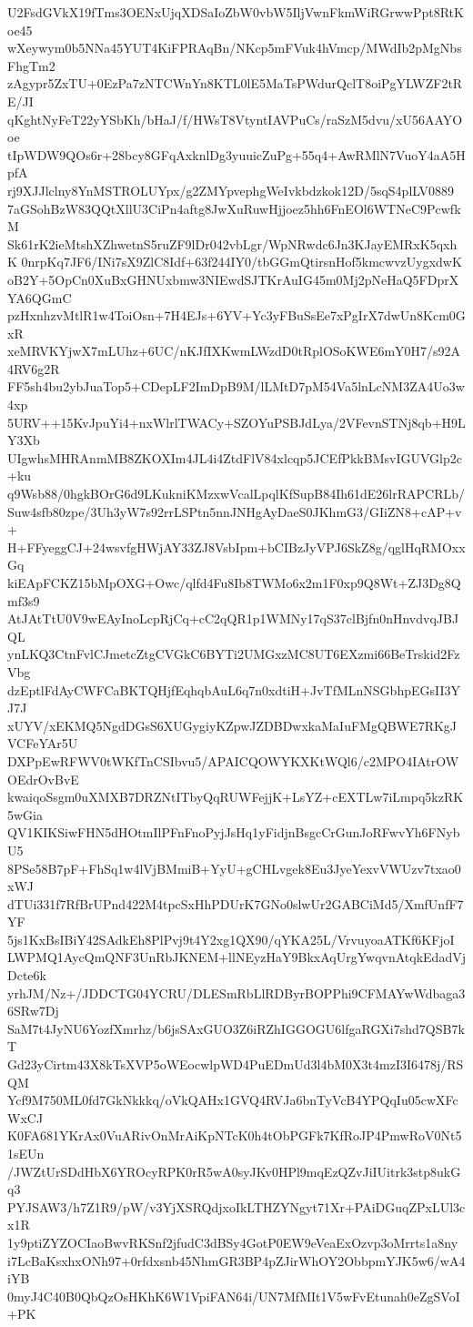 U2FsdGVkX19fTms3OENxUjqXDSaIoZbW0vbW5IljVwnFkmWiRGrwwPpt8RtKoe45
wXeywym0b5NNa45YUT4KiFPRAqBn/NKcp5mFVuk4hVmcp/MWdIb2pMgNbsFhgTm2
zAgypr5ZxTU+0EzPa7zNTCWnYn8KTL0lE5MaTsPWdurQclT8oiPgYLWZF2tRE/JI
qKghtNyFeT22yYSbKh/bHaJ/f/HWsT8VtyntIAVPuCs/raSzM5dvu/xU56AAYOoe
tIpWDW9QOs6r+28bcy8GFqAxknlDg3yuuicZuPg+55q4+AwRMlN7VuoY4aA5HpfA
rj9XJJlclny8YnMSTROLUYpx/g2ZMYpvephgWeIvkbdzkok12D/5sqS4plLV0889
7aGSohBzW83QQtXllU3CiPn4aftg8JwXuRuwHjjoez5hh6FnEOl6WTNeC9PcwfkM
Sk61rK2ieMtshXZhwetnS5ruZF9lDr042vbLgr/WpNRwdc6Jn3KJayEMRxK5qxhK
0nrpKq7JF6/INi7sX9ZlC8Idf+63f244IY0/tbGGmQtirsnHof5kmcwvzUygxdwK
oB2Y+5OpCn0XuBxGHNUxbmw3NIEwdSJTKrAuIG45m0Mj2pNeHaQ5FDprXYA6QGmC
pzHxnhzvMtlR1w4ToiOsn+7H4EJs+6YV+Yc3yFBuSsEe7xPgIrX7dwUn8Kcm0GxR
xeMRVKYjwX7mLUhz+6UC/nKJfIXKwmLWzdD0tRplOSoKWE6mY0H7/s92A4RV6g2R
FF5sh4bu2ybJuaTop5+CDepLF2ImDpB9M/lLMtD7pM54Va5lnLcNM3ZA4Uo3w4xp
5URV++15KvJpuYi4+nxWlrlTWACy+SZOYuPSBJdLya/2VFevnSTNj8qb+H9LY3Xb
UIgwhsMHRAnmMB8ZKOXIm4JL4i4ZtdFlV84xlcqp5JCEfPkkBMsvIGUVGlp2c+ku
q9Wsb88/0hgkBOrG6d9LKukniKMzxwVcalLpqlKfSupB84Ih61dE26lrRAPCRLb/
Suw4sfb80zpe/3Uh3yW7s92rrLSPtn5nnJNHgAyDaeS0JKhmG3/GIiZN8+cAP+v+
H+FFyeggCJ+24wsvfgHWjAY33ZJ8VsbIpm+bCIBzJyVPJ6SkZ8g/qglHqRMOxxGq
kiEApFCKZ15bMpOXG+Owc/qlfd4Fu8Ib8TWMo6x2m1F0xp9Q8Wt+ZJ3Dg8Qmf3s9
AtJAtTtU0V9wEAyInoLcpRjCq+cC2qQR1p1WMNy17qS37clBjfn0nHnvdvqJBJQL
ynLKQ3CtnFvlCJmetcZtgCVGkC6BYTi2UMGxzMC8UT6EXzmi66BeTrskid2FzVbg
dzEptlFdAyCWFCaBKTQHjfEqhqbAuL6q7n0xdtiH+JvTfMLnNSGbhpEGsII3YJ7J
xUYV/xEKMQ5NgdDGsS6XUGygiyKZpwJZDBDwxkaMaIuFMgQBWE7RKgJVCFeYAr5U
DXPpEwRFWV0tWKfTnCSIbvu5/APAICQOWYKXKtWQl6/c2MPO4IAtrOWOEdrOvBvE
kwaiqoSsgm0uXMXB7DRZNtITbyQqRUWFejjK+LsYZ+cEXTLw7iLmpq5kzRK5wGia
QV1KIKSiwFHN5dHOtmIlPFnFnoPyjJsHq1yFidjnBsgcCrGunJoRFwvYh6FNybU5
8PSe58B7pF+FhSq1w4lVjBMmiB+YyU+gCHLvgek8Eu3JyeYexvVWUzv7txao0xWJ
dTUi331f7RfBrUPnd422M4tpcSxHhPDUrK7GNo0slwUr2GABCiMd5/XmfUnfF7YF
5js1KxBsIBiY42SAdkEh8PlPvj9t4Y2xg1QX90/qYKA25L/VrvuyoaATKf6KFjoI
LWPMQ1AycQmQNF3UnRbJKNEM+llNEyzHaY9BkxAqUrgYwqvnAtqkEdadVjDcte6k
yrhJM/Nz+/JDDCTG04YCRU/DLESmRbLlRDByrBOPPhi9CFMAYwWdbaga36SRw7Dj
SaM7t4JyNU6YozfXmrhz/b6jsSAxGUO3Z6iRZhIGGOGU6lfgaRGXi7shd7QSB7kT
Gd23yCirtm43X8kTsXVP5oWEocwlpWD4PuEDmUd3l4bM0X3t4mzI3I6478j/RSQM
Ycf9M750ML0fd7GkNkkkq/oVkQAHx1GVQ4RVJa6bnTyVcB4YPQqIu05cwXFcWxCJ
K0FA681YKrAx0VuARivOnMrAiKpNTcK0h4tObPGFk7KfRoJP4PmwRoV0Nt51sEUn
/JWZtUrSDdHbX6YROcyRPK0rR5wA0syJKv0HPl9mqEzQZvJiIUitrk3stp8ukGq3
PYJSAW3/h7Z1R9/pW/v3YjXSRQdjxoIkLTHZYNgyt71Xr+PAiDGuqZPxLUl3cx1R
1y9ptiZYZOCIaoBwvRKSnf2jfudC3dBSy4GotP0EW9eVeaExOzvp3oMrrts1a8ny
i7LcBaKsxhxONh97+0rfdxsnb45NhmGR3BP4pZJirWhOY2ObbpmYJK5w6/wA4iYB
0myJ4C40B0QbQzOsHKhK6W1VpiFAN64i/UN7MfMIt1V5wFvEtunah0eZgSVoI+PK
